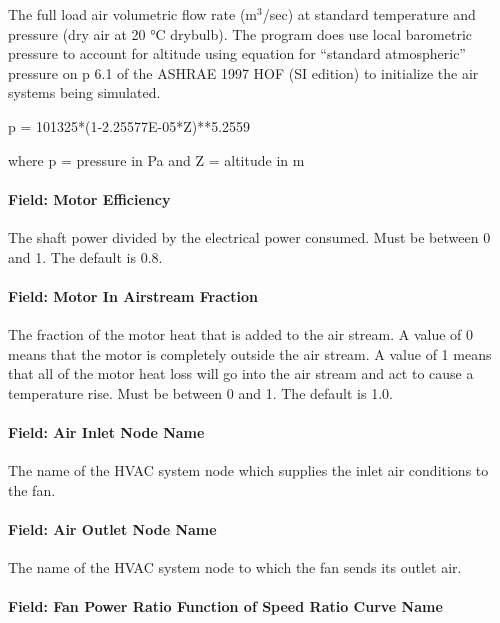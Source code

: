 The full load air volumetric flow rate (m\(^{3}\)/sec) at standard temperature and pressure (dry air at 20 °C drybulb). The program does use local barometric pressure to account for altitude using equation for ``standard atmospheric'' pressure on p 6.1 of the ASHRAE 1997 HOF (SI edition) to initialize the air systems being simulated.

p = 101325*(1-2.25577E-05*Z)**5.2559

where p = pressure in Pa and Z = altitude in m

\paragraph{Field: Motor Efficiency}\label{field-motor-efficiency-1}

The shaft power divided by the electrical power consumed. Must be between 0 and 1. The default is 0.8.

\paragraph{Field: Motor In Airstream Fraction}\label{field-motor-in-airstream-fraction-1}

The fraction of the motor heat that is added to the air stream. A value of 0 means that the motor is completely outside the air stream. A value of 1 means that all of the motor heat loss will go into the air stream and act to cause a temperature rise. Must be between 0 and 1. The default is 1.0.

\paragraph{Field: Air Inlet Node Name}\label{field-air-inlet-node-name-1-002}

The name of the HVAC system node which supplies the inlet air conditions to the fan.

\paragraph{Field: Air Outlet Node Name}\label{field-air-outlet-node-name-1-001}

The name of the HVAC system node to which the fan sends its outlet air.

\paragraph{Field: Fan Power Ratio Function of Speed Ratio Curve Name}\label{field-fan-power-ratio-function-of-speed-ratio-curve-name}

